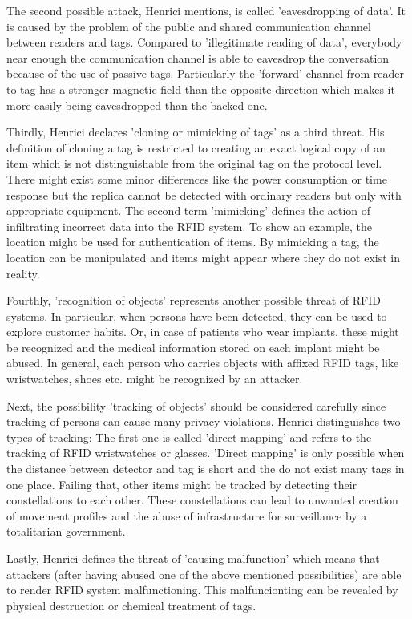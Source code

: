 The second possible attack, Henrici mentions, is called 'eavesdropping of data'. It is caused by the problem of the public and shared communication channel between readers and tags. Compared to 'illegitimate reading of data', everybody near enough the communication channel is able to eavesdrop the conversation because of the use of passive tags. Particularly the 'forward' channel from reader to tag has a stronger magnetic field than the opposite direction which makes it more easily being eavesdropped than the backed one. 

Thirdly, Henrici declares 'cloning or mimicking of tags' as a third threat. His definition of cloning a tag is restricted to creating an exact logical copy of an item which is not distinguishable from the original tag on the protocol level. There might exist some minor differences like the power consumption or time response but the replica cannot be detected with ordinary readers but only with appropriate equipment. The second term 'mimicking' defines the action of infiltrating incorrect data into the RFID system. To show an example, the location might be used for authentication of items. By mimicking a tag, the location can be manipulated and items might appear where they do not exist in reality.

Fourthly, 'recognition of objects' represents another possible threat of RFID systems. In particular, when persons have been detected, they can be used to explore customer habits. Or, in case of patients who wear implants, these might be recognized and the medical information stored on each implant might be abused. In general, each person who carries objects with affixed RFID tags, like wristwatches, shoes etc. might be recognized by an attacker.

Next, the possibility 'tracking of objects' should be considered carefully since tracking of persons can cause many privacy violations. Henrici distinguishes two types of tracking: The first one is called 'direct mapping' and refers to the tracking of RFID wristwatches or glasses. 'Direct mapping' is only possible when the distance between detector and tag is short and the do not exist many tags in one place. Failing that, other items might be tracked by detecting their constellations to each other. These constellations can lead to unwanted creation of movement profiles and the abuse of infrastructure for surveillance by a totalitarian government.

Lastly, Henrici defines the threat of 'causing malfunction' which means that attackers (after having abused one of the above mentioned possibilities) are able to render RFID system malfunctioning. This malfuncionting can be revealed by physical destruction or chemical treatment of tags.  

